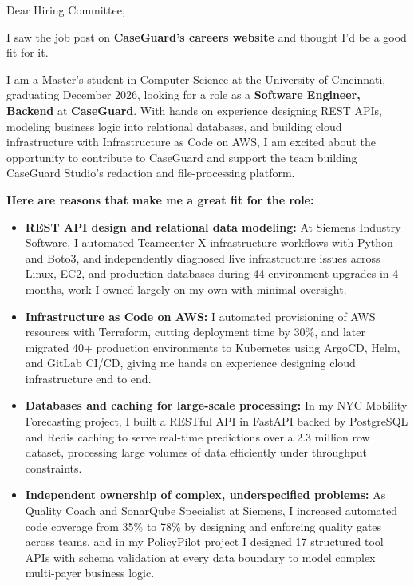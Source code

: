 \documentclass[11pt]{letter}
\date{}
\begin{document}
\begin{letter}{}

\opening{Dear Hiring Committee,}

I saw the job post on \textbf{CaseGuard's careers website} and thought I'd be a good fit for it.

I am a Master's student in Computer Science at the University of Cincinnati, graduating December 2026, looking for a role as a \textbf{Software Engineer, Backend} at \textbf{CaseGuard}. With hands on experience designing REST APIs, modeling business logic into relational databases, and building cloud infrastructure with Infrastructure as Code on AWS, I am excited about the opportunity to contribute to CaseGuard and support the team building CaseGuard Studio's redaction and file-processing platform.

\textbf{Here are reasons that make me a great fit for the role:}

\begin{itemize}[leftmargin=*, itemsep=0.45em]
    \item \textbf{REST API design and relational data modeling:} At Siemens Industry Software, I automated Teamcenter X infrastructure workflows with Python and Boto3, and independently diagnosed live infrastructure issues across Linux, EC2, and production databases during 44 environment upgrades in 4 months, work I owned largely on my own with minimal oversight.

    \item \textbf{Infrastructure as Code on AWS:} I automated provisioning of AWS resources with Terraform, cutting deployment time by 30\%, and later migrated 40+ production environments to Kubernetes using ArgoCD, Helm, and GitLab CI/CD, giving me hands on experience designing cloud infrastructure end to end.

    \item \textbf{Databases and caching for large-scale processing:} In my NYC Mobility Forecasting project, I built a RESTful API in FastAPI backed by PostgreSQL and Redis caching to serve real-time predictions over a 2.3 million row dataset, processing large volumes of data efficiently under throughput constraints.

    \item \textbf{Independent ownership of complex, underspecified problems:} As Quality Coach and SonarQube Specialist at Siemens, I increased automated code coverage from 35\% to 78\% by designing and enforcing quality gates across teams, and in my PolicyPilot project I designed 17 structured tool APIs with schema validation at every data boundary to model complex multi-payer business logic.
\end{itemize}


\end{letter}
\end{document}

